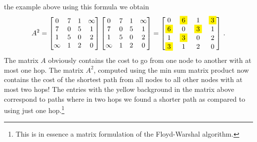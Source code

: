 the example above using this formula we obtain
\begin{equation*}
  A^2 =
  \begin{bmatrix}    
    0 & 7 & 1 & \infty \\
    7 & 0 & 5 & 1 \\
    1 & 5 & 0 & 2 \\
    \infty & 1 & 2 & 0
  \end{bmatrix}
  \begin{bmatrix}    
    0 & 7 & 1 & \infty \\
    7 & 0 & 5 & 1 \\
    1 & 5 & 0 & 2 \\
    \infty & 1 & 2 & 0
  \end{bmatrix}
  =
  \begin{bmatrix}    
    0 & \colorbox{yellow}{6} & 1 & \colorbox{yellow}{3} \\
    \colorbox{yellow}{6} & 0 & \colorbox{yellow}{3} & 1 \\
    1 & \colorbox{yellow}{3} & 0 & 2 \\
    \colorbox{yellow}{3} & 1 & 2 & 0
  \end{bmatrix}\,.
\end{equation*}
The matrix $A$ obviously contains the cost to go from one node to another with
at most one hop. The matrix $A^2$, computed using the min sum matrix product now
contains the cost of the shortest path from all nodes to all other nodes with at
most two hops! The entries with the yellow background in the matrix above
correspond to paths where in two hops we found a shorter path as compared to
using just one hop.\footnote{This is in essence a matrix formulation of the
  Floyd-Warshal algorithm.}

